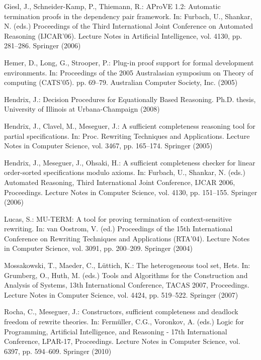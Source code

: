 \documentclass{llncs}
\begin{document}
\begin{thebibliography}{10}
Giesl, J., Schneider-Kamp, P., Thiemann, R.: {AProVE} 1.2: Automatic
  termination proofs in the dependency pair framework. In: Furbach, U.,
  Shankar, N. (eds.) Proceedings of the Third International Joint Conference on
  Automated Reasoning (IJCAR'06). Lecture Notes in Artificial Intelligence,
  vol. 4130, pp. 281--286. Springer (2006)

Hemer, D., Long, G., Strooper, P.: Plug-in proof support for formal development
  environments. In: Proceedings of the 2005 Australasian symposium on Theory of
  computing (CATS'05). pp. 69--79. Australian Computer Society, Inc. (2005)

Hendrix, J.: Decision Procedures for Equationally Based Reasoning. Ph.D.
  thesis, University of Illinois at Urbana-Champaign (2008)

Hendrix, J., Clavel, M., Meseguer, J.: A sufficient completeness reasoning tool
  for partial specifications. In: Proc. Rewriting Techniques and Applications.
  Lecture Notes in Computer Science, vol. 3467, pp. 165--174. Springer (2005)

Hendrix, J., Meseguer, J., Ohsaki, H.: A sufficient completeness checker for
  linear order-sorted specifications modulo axioms. In: Furbach, U., Shankar,
  N. (eds.) Automated Reasoning, Third International Joint Conference, IJCAR
  2006, Proceedings. Lecture Notes in Computer Science, vol. 4130, pp.
  151--155. Springer (2006)

Lucas, S.: {MU-TERM}: A tool for proving termination of context-sensitive
  rewriting. In: van Oostrom, V. (ed.) Proceedings of the 15th International
  Conference on Rewriting Techniques and Applications (RTA'04). Lecture Notes
  in Computer Science, vol. 3091, pp. 200--209. Springer (2004)

Mossakowski, T., Maeder, C., L\"uttich, K.: The heterogeneous tool set, {H}ets.
  In: Grumberg, O., Huth, M. (eds.) Tools and Algorithms for the Construction
  and Analysis of Systems, 13th International Conference, TACAS 2007,
  Proceedings. Lecture Notes in Computer Science, vol. 4424, pp. 519--522.
  Springer (2007)

Rocha, C., Meseguer, J.: Constructors, sufficient completeness and deadlock
  freedom of rewrite theories. In: Ferm\"uller, C.G., Voronkov, A. (eds.) Logic
  for Programming, Artificial Intelligence, and Reasoning - 17th International
  Conference, LPAR-17, Proceedings. Lecture Notes in Computer Science, vol.
  6397, pp. 594--609. Springer (2010)

\end{thebibliography}
\end{document}
